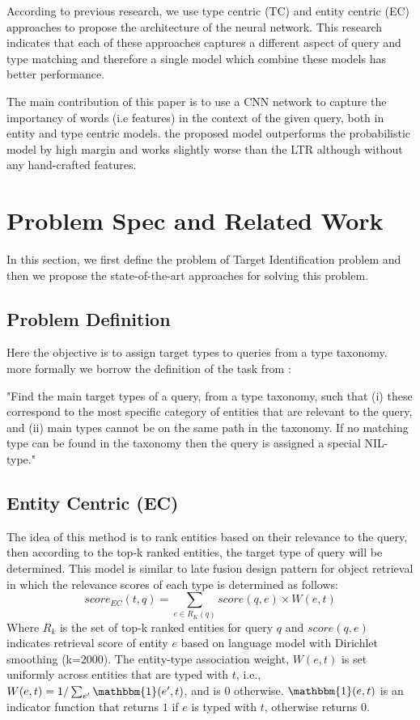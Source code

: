 According to previous research, we use type centric (TC) and entity centric (EC) approaches to propose the architecture of the neural network. This research indicates that each of these approaches captures a different aspect of query and type matching and therefore a single model which combine these models has better performance.

The main contribution of this paper is to use a CNN network to capture the importancy of words (i.e features) in the context of the given query, both in entity and type centric models. the proposed model outperforms the probabilistic model by high margin and works slightly worse than the LTR although without any hand-crafted features.

\section{Problem Spec and Related Work}
In this section, we first define the problem of Target Identification problem and then we propose the state-of-the-art approaches for solving this problem.

\subsection{Problem Definition}
Here the objective is to assign target types to queries from a type taxonomy. more formally we borrow the definition of the task from \cite{Garigliotti:2017:TTI:3077136.3080659}:

"Find the main target types of a query, from a type taxonomy, such that (i) these correspond to the most specific category of entities that are relevant to the query, and (ii) main types cannot be on the same path in the taxonomy. If no matching type can be found in the taxonomy then the query is assigned a special NIL-type."

\subsection{Entity Centric (EC)}\label{EC}
The idea of this method is to rank entities based on their relevance to the query, then according to the top-k ranked entities, the target type of query will be determined. This model is similar to late fusion design pattern for object retrieval \cite{zhang2017design} in which the relevance scores of each type is determined as follows:
\begin{equation}
score_{EC}(t,q) = \sum_{e\in R_K(q)}{score(q,e)\times W(e,t)}
\end{equation}
Where $R_k$ is the set of top-k ranked entities for query $q$ and $score(q,e)$ indicates retrieval score of entity $e$ based on language model with Dirichlet smoothing (k=2000). The entity-type association weight, $W(e,t)$ is set uniformly across entities that are typed with $t$, i.e., $W(e,t)=1/\sum_{e^\prime}{\mathbbm{1}(e^\prime,t)}$, and is 0 otherwise.
$\mathbbm{1}(e,t)$ is an indicator function that returns $1$ if $e$ is typed with $t$, otherwise returns $0$.

